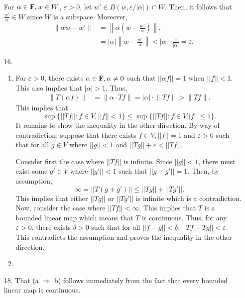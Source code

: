 \documentclass{article}
\newcommand{\eps}{\varepsilon}
\theoremstyle{remark}
\begin{document}
\begin{enumerate}[leftmargin=*]
    For $\alpha \in \mathbf{F}, w \in W$, $\eps > 0$, let $w' \in B(w, \eps/|\alpha|) \cap W$. Then, it follows that $\frac{w'}{\alpha} \in W$ since $W$ is a subspace. Moreover,
    \begin{align*}
        \lVert \alpha w - w' \rVert &= \left\lVert \alpha\left(w - \frac{w'}{\alpha}\right)\right\rVert, \\
        &= |\alpha|\left\lVert w - \frac{w'}{\alpha}\right\rVert < |\alpha|\cdot \frac{\eps}{|\alpha|} = \eps.
    \end{align*}

    
    \item[16.] \begin{enumerate}
        \item For $\eps > 0$, there exists $\alpha \in \mathbf{F}, \alpha \neq 0$ such that $|| \alpha f || = 1$ when $|| f || < 1$. This also implies that $|\alpha| > 1$. Thus, 
        \begin{align*}
            \lVert T(\alpha f) \rVert &= \lVert \alpha \cdot Tf \rVert = |\alpha|\cdot \lVert Tf \rVert > \lVert  Tf \rVert.
        \end{align*}
        This implies that 
        \[
        \sup\{|| Tf || : f\in V, ||f || < 1\} \leq \sup \{ || Tf || : f \in V ||f || \leq 1\}.
        \]
        It remains to show the inequality in the other direction. By way of contradiction, suppose that there exists $f \in V, ||f || = 1$ and $\eps > 0$ such that for all $g \in V$ where $||g|| < 1$ and $||Tg || + \eps < ||Tf||$. 

        Consider first the case where $||Tf||$ is infinite. Since $||g || < 1$, there must exist some $g' \in V$ where $||g' || < 1$ such that $|| g + g' || = 1$. Then, by assumption,
        \[
        \infty = || T (g + g') || \leq || T g || + || T g' ||.
        \]
        This implies that either $|| Tg ||$ or $|| T g'||$ is infinite which is a contradiction. Now, consider the case where $|| Tf || < \infty$. This implies that $T$ is a bounded linear map which means that $T$ is continuous. Thus, for any $\eps > 0$, there exists $\delta > 0$ such that for all $|| f -g || < \delta$, $|| Tf - Tg || < \eps$. This contradicts the assumption and proves the inequality in the other direction.

        \item 

        
    \end{enumerate}
    \item[18.] That (a $\Rightarrow$ b) follows immediately from the fact that every bounded linear map is continuous.
\end{enumerate}
\end{document}
